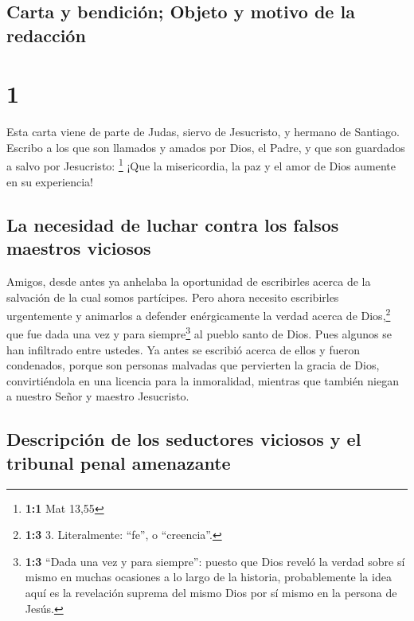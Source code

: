 \hypertarget{carta-y-bendiciuxf3n-objeto-y-motivo-de-la-redacciuxf3n}{%
\subsection{Carta y bendición; Objeto y motivo de la
redacción}\label{carta-y-bendiciuxf3n-objeto-y-motivo-de-la-redacciuxf3n}}

\hypertarget{section}{%
\section{1}\label{section}}

 Esta carta viene de parte de Judas, siervo de Jesucristo,
y hermano de Santiago. Escribo a los que son llamados y amados por Dios,
el Padre, y que son guardados a salvo por Jesucristo: \footnote{\textbf{1:1}
  Mat 13,55}  ¡Que la misericordia, la paz y el amor de
Dios aumente en su experiencia!

\hypertarget{la-necesidad-de-luchar-contra-los-falsos-maestros-viciosos}{%
\subsection{La necesidad de luchar contra los falsos maestros
viciosos}\label{la-necesidad-de-luchar-contra-los-falsos-maestros-viciosos}}

 Amigos, desde antes ya anhelaba la oportunidad de
escribirles acerca de la salvación de la cual somos partícipes. Pero
ahora necesito escribirles urgentemente y animarlos a defender
enérgicamente la verdad acerca de Dios,\footnote{\textbf{1:3} 3.
  Literalmente: ``fe'', o ``creencia''.} que fue dada una vez y para
siempre\footnote{\textbf{1:3} ``Dada una vez y para siempre'': puesto
  que Dios reveló la verdad sobre sí mismo en muchas ocasiones a lo
  largo de la historia, probablemente la idea aquí es la revelación
  suprema del mismo Dios por sí mismo en la persona de Jesús.} al pueblo
santo de Dios.  Pues algunos se han infiltrado entre
ustedes. Ya antes se escribió acerca de ellos y fueron condenados,
porque son personas malvadas que pervierten la gracia de Dios,
convirtiéndola en una licencia para la inmoralidad, mientras que también
niegan a nuestro Señor y maestro Jesucristo.

\hypertarget{descripciuxf3n-de-los-seductores-viciosos-y-el-tribunal-penal-amenazante}{%
\subsection{Descripción de los seductores viciosos y el tribunal penal
amenazante}\label{descripciuxf3n-de-los-seductores-viciosos-y-el-tribunal-penal-amenazante}}

